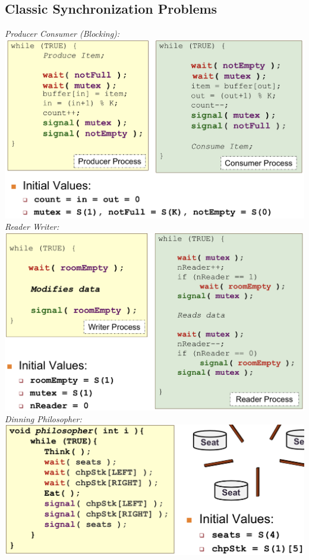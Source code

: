 \subsection*{Classic Synchronization Problems}
\emph{Producer Consumer (Blocking):}\\
\includegraphics[width=0.75\linewidth]{images/producer-consumer}\\
\emph{Reader Writer:}\\
\includegraphics[width=0.75\linewidth]{images/reader-writer}\\
\emph{Dinning Philosopher:}\\
\includegraphics[width=0.75\linewidth]{images/philo-limited-eater}

